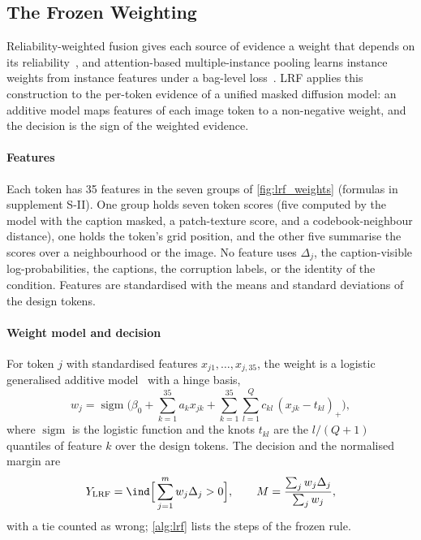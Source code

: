 \subsection{The Frozen Weighting}\label{sec:study2-method}
Reliability-weighted fusion gives each source of evidence a weight that depends on its
reliability~\cite{chair1986optimal,kittler1998combining,zhang2023provable,han2023trusted,li2026tcpfmc}, and attention-based
multiple-instance pooling learns instance weights from instance features under a bag-level loss~\cite{ilse2018attention}.
LRF applies this construction to the per-token evidence of a unified masked diffusion model: an additive model maps features of each
image token to a non-negative weight, and the decision is the sign of the weighted evidence.

\paragraph*{Features}
Each token has 35 features in the seven groups of \cref{fig:lrf_weights} (formulas in supplement S-II).
One group holds seven token scores (five computed by the model with the caption masked, a patch-texture score, and a codebook-neighbour
distance), one holds the token's grid position, and the other five summarise the scores over a neighbourhood or the image.
No feature uses $\Delta_j$, the caption-visible log-probabilities, the captions, the corruption labels, or the identity of the condition.
Features are standardised with the means and standard deviations of the design tokens.

\paragraph*{Weight model and decision}
For token $j$ with standardised features $x_{j1},\dots,x_{j,35}$, the weight is a logistic generalised additive model~\cite{hastie1990generalized} with a hinge basis,
\begin{equation}
w_j=\operatorname{sigm}\Big(\beta_0+\sum_{k=1}^{35}a_kx_{jk}+\sum_{k=1}^{35}\sum_{l=1}^{Q}c_{kl}\,(x_{jk}-t_{kl})_+\Big),
\label{eq:lrf-weight}
\end{equation}
where $\operatorname{sigm}$ is the logistic function and the knots $t_{kl}$ are the $l/(Q+1)$ quantiles of feature $k$ over the design tokens.
The decision and the normalised margin are
\begin{equation}
Y_{\rm LRF}=\ind\Big[\sum_{j=1}^{m}w_j\Delta_j>0\Big],\qquad M=\frac{\sum_jw_j\Delta_j}{\sum_jw_j},
\label{eq:lrf-decision}
\end{equation}
with a tie counted as wrong; \cref{alg:lrf} lists the steps of the frozen rule.

